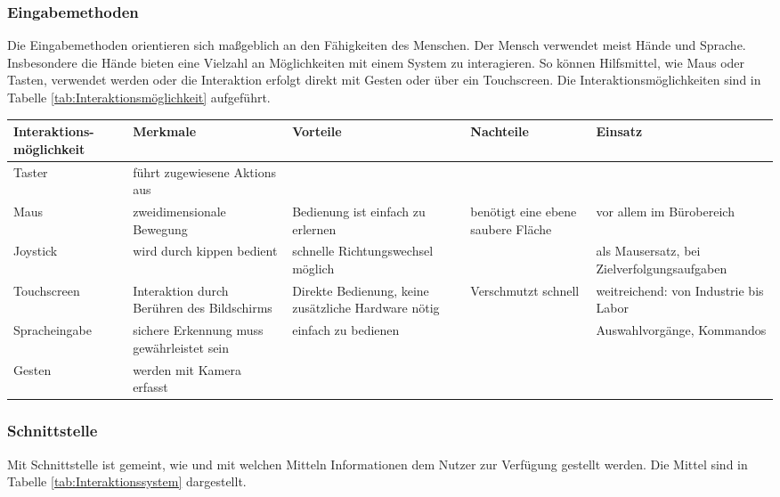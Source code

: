 \subsubsection*{Eingabemethoden}
Die Eingabemethoden orientieren sich maßgeblich an den Fähigkeiten des Menschen. Der Mensch verwendet meist Hände und Sprache. Insbesondere die Hände bieten eine Vielzahl an Möglichkeiten mit einem System zu interagieren. So können Hilfsmittel, wie Maus oder Tasten, verwendet werden oder die Interaktion erfolgt direkt mit Gesten oder über ein Touchscreen. Die Interaktionsmöglichkeiten sind in Tabelle \ref{tab:Interaktionsmöglichkeit} aufgeführt.

\begin{sidewaystable}[ph!]
\begin{tabular}{p{3cm}|p{4cm}|p{4cm}|p{3cm}|p{3cm}}
	\textbf{Interaktions-möglichkeit} & \textbf{Merkmale} & \textbf{Vorteile} & \textbf{Nachteile} & \textbf{Einsatz} \\
	\hline
	Taster & führt zugewiesene Aktions aus & & & \\
	\hline
	Maus & zweidimensionale Bewegung & Bedienung ist einfach zu erlernen & benötigt eine ebene saubere Fläche & vor allem im Bürobereich\\
	\hline
	Joystick & wird durch kippen bedient & schnelle Richtungswechsel möglich & & als Mausersatz, bei Zielverfolgungsaufgaben \\
	\hline
	Touchscreen & Interaktion durch Berühren des Bildschirms & Direkte Bedienung, keine zusätzliche Hardware nötig & Verschmutzt schnell & weitreichend: von Industrie bis Labor \\
	\hline
	Spracheingabe & sichere Erkennung muss gewährleistet sein & einfach zu bedienen & & Auswahlvorgänge, Kommandos \\
	\hline
	Gesten & werden mit Kamera erfasst & & & \\
	\hline
\end{tabular}
\label{tab:Interaktionsmöglichkeit}
\caption{Interaktionsmöglichkeiten mit einem Assistenzsystem}
\end{sidewaystable}

\subsubsection*{Schnittstelle}
Mit Schnittstelle ist gemeint, wie und mit welchen Mitteln Informationen dem Nutzer zur Verfügung gestellt werden. Die Mittel sind in Tabelle \ref{tab:Interaktionssystem} dargestellt.

